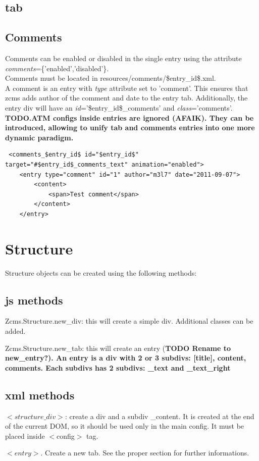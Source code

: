 \documentclass[a4paper,12pt]{article}
\begin{document}
\subsection{tab}
\subsection{Comments}
Comments can be enabled or disabled in the single entry using the attribute \emph{comments}=\{'enabled','disabled'\}.\\
Comments must be located in resources/comments/\$entry\_id\$.xml.\\
A comment is an entry with \emph{type} attribute set to 'comment'. This ensures that zcms adds author of the comment and date to the entry tab.
Additionally, the entry div will have an \emph{id}='\$entry\_id\$\_comments' and \emph{class}='comments'.\\[0.2cm]
\bfseries{TODO}.\normalfont ATM configs inside entries are ignored (AFAIK). They can be introduced, allowing to unify tab and comments entries into one more dynamic paradigm.
\footnotesize

\begin{verbatim}
 <comments_$entry_id$ id="$entry_id$" target="#$entry_id$_comments_text" animation="enabled">
	<entry type="comment" id="1" author="m3l7" date="2011-09-07">
		<content>
			<span>Test comment</span>
		</content>
	</entry>
\end{verbatim}

\section{Structure}
Structure objects can be created using the following methods:
\subsection{js methods}
\begin{list}{-}{}
 \item Zcms.Structure.new\_div: this will create a simple div. Additional classes can be added.
\item Zcms.Structure.new\_tab: this will create an entry (\bfseries{TODO} \normalfont Rename to new\_entry?). An entry is a div with 2 or 3 subdivs: [title], content, comments. Each subdivs has 2 subdivs: \_text and \_text\_right
\end{list}
\subsection{xml methods}
\begin{list}{-}{}
  \item $<structure\_div>$: create a div and a subdiv \_content. It is created at the end of the current DOM, so it should be used only in the main config. It must be placed inside $<$config$>$ tag.
\item $<entry>$. Create a new tab. See the proper section for further informations.
\item 
\end{list}
\end{document}

